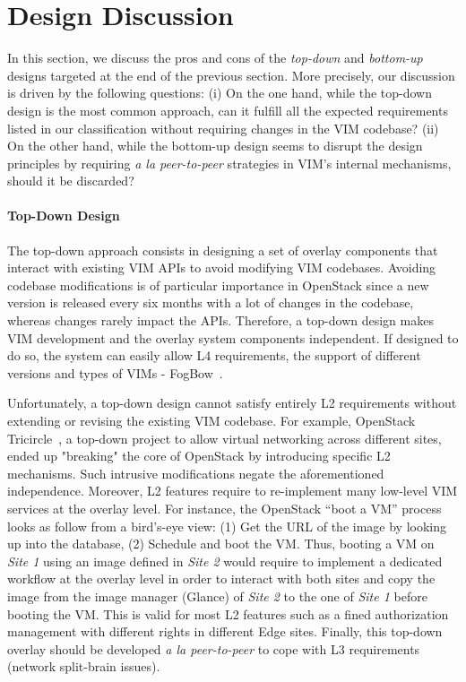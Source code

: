
\section{Design Discussion}
\label{sec:design_discussion}

In this section, we discuss the pros and cons of the \emph{top-down} and
\emph{bottom-up} designs targeted at the end of the previous section.
More precisely, our discussion is driven by the following questions: (i) On the
one hand, while the top-down design is the most common approach, can it fulfill
all the expected requirements listed in our classification without requiring
changes in the VIM codebase? (ii) On the other hand, while the bottom-up design
seems to disrupt the design principles by requiring \emph{a la peer-to-peer}
strategies in VIM's internal mechanisms, should it be discarded?

\paragraph{Top-Down Design}
The top-down approach consists in designing a set of overlay components that
interact with existing VIM APIs to avoid modifying VIM codebases.
Avoiding codebase modifications is of particular importance in OpenStack since
a new version is released every six months with a lot of changes in the
codebase, whereas changes rarely impact the APIs. Therefore, a top-down design
makes VIM development and the overlay system components independent. If
designed to do so, the system can easily allow L4 requirements, \ie the
support of different versions and types of VIMs - \eg
FogBow~\cite{brasileiro2016fogbow}.

Unfortunately, a top-down design cannot satisfy entirely L2 requirements
without extending or revising the existing VIM codebase. For example,
OpenStack Tricircle~\cite{tricircle}, a top-down project to allow
virtual networking across different sites, ended up "breaking" the
core of OpenStack by introducing specific L2 mechanisms. Such
intrusive modifications negate the aforementioned independence.
%
Moreover, L2 features require to
re-implement many low-level VIM services at the overlay level. For
instance, the OpenStack ``boot a VM'' process looks as follow from a
bird's-eye view: (1) Get the URL of the image by looking up into the
database, (2) Schedule and boot the VM. Thus, booting a VM on
\emph{Site 1} using an image defined in \emph{Site 2} would require to
implement a dedicated workflow at the overlay level in order to
interact with both sites and copy the image from the image manager
(\ie Glance) of \emph{Site 2} to the one of \emph{Site 1} before booting the VM. 
%
This is valid for most L2 features such as a fined authorization management
with different rights in different Edge sites.
%
Finally, this top-down overlay should be developed \emph{a la
  peer-to-peer} to cope with L3 requirements (\ie network split-brain
issues).



